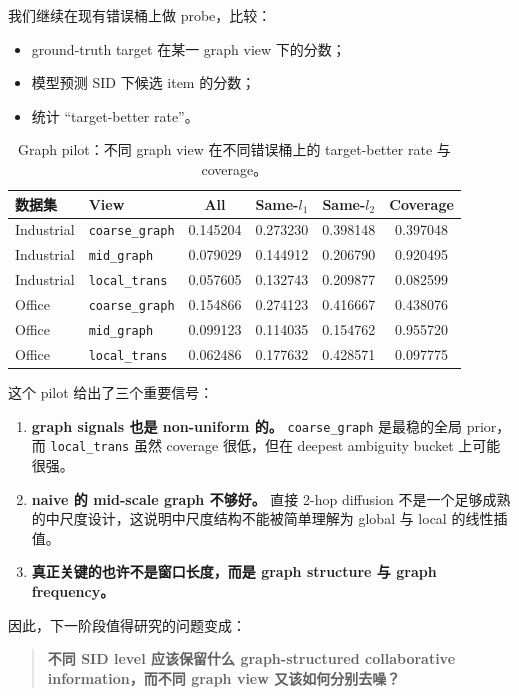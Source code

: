 \documentclass[11pt]{article}
\begin{document}
我们继续在现有错误桶上做 probe，比较：
\begin{itemize}
  \item ground-truth target 在某一 graph view 下的分数；
  \item 模型预测 SID 下候选 item 的分数；
  \item 统计 ``target-better rate''。
\end{itemize}

\begin{table}[t]
  \centering
  \caption{Graph pilot：不同 graph view 在不同错误桶上的 target-better rate 与 coverage。}
  \small
  \begin{tabular}{l l S[table-format=1.6] S[table-format=1.6] S[table-format=1.6] S[table-format=1.6]}
    \toprule
    数据集 & View & {All} & {Same-$l_1$} & {Same-$l_2$} & {Coverage} \\
    \midrule
    Industrial & \texttt{coarse\_graph} & 0.145204 & 0.273230 & 0.398148 & 0.397048 \\
    Industrial & \texttt{mid\_graph}    & 0.079029 & 0.144912 & 0.206790 & 0.920495 \\
    Industrial & \texttt{local\_trans}  & 0.057605 & 0.132743 & 0.209877 & 0.082599 \\
    \midrule
    Office & \texttt{coarse\_graph} & 0.154866 & 0.274123 & 0.416667 & 0.438076 \\
    Office & \texttt{mid\_graph}    & 0.099123 & 0.114035 & 0.154762 & 0.955720 \\
    Office & \texttt{local\_trans}  & 0.062486 & 0.177632 & 0.428571 & 0.097775 \\
    \bottomrule
  \end{tabular}
\end{table}

这个 pilot 给出了三个重要信号：
\begin{enumerate}
  \item \textbf{graph signals 也是 non-uniform 的。} \texttt{coarse\_graph} 是最稳的全局 prior，而 \texttt{local\_trans} 虽然 coverage 很低，但在 deepest ambiguity bucket 上可能很强。
  \item \textbf{naive 的 mid-scale graph 不够好。} 直接 2-hop diffusion 不是一个足够成熟的中尺度设计，这说明中尺度结构不能被简单理解为 global 与 local 的线性插值。
  \item \textbf{真正关键的也许不是窗口长度，而是 graph structure 与 graph frequency。}
\end{enumerate}

因此，下一阶段值得研究的问题变成：
\begin{quote}
\textbf{不同 SID level 应该保留什么 graph-structured collaborative information，而不同 graph view 又该如何分别去噪？}
\end{quote}
\end{document}
